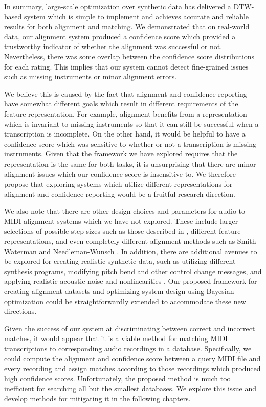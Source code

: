 In summary, large-scale optimization over synthetic data has delivered a DTW-based system which is simple to implement and achieves accurate and reliable results for both alignment and matching.
We demonstrated that on real-world data, our alignment system produced a confidence score which provided a trustworthy indicator of whether the alignment was successful or not.
Nevertheless, there was some overlap between the confidence score distributions for each rating.
This implies that our system cannot detect fine-grained issues such as missing instruments or minor alignment errors.

We believe this is caused by the fact that alignment and confidence reporting have somewhat different goals which result in different requirements of the feature representation.
For example, alignment benefits from a representation which is invariant to missing instruments so that it can still be successful when a transcription is incomplete.
On the other hand, it would be helpful to have a confidence score which was sensitive to whether or not a transcription is missing instruments.
Given that the framework we have explored requires that the representation is the same for both tasks, it is unsurprising that there are minor alignment issues which our confidence score is insensitive to.
We therefore propose that exploring systems which utilize different representations for alignment and confidence reporting would be a fruitful research direction.

We also note that there are other design choices and parameters for audio-to-MIDI alignment systems which we have not explored.
These include larger selections of possible step sizes such as those described in \cite{muller2007dynamic, sakoe1978dynamic}, different feature representations, and even completely different alignment methods such as Smith-Waterman \cite{ewert2012towards} and Needleman-Wunsch \cite{grachten2013automatic}.
In addition, there are additional avenues to be explored for creating realistic synthetic data, such as utilizing different synthesis programs, modifying pitch bend and other control change messages, and applying realistic acoustic noise and nonlinearities \cite{mcfee2015software}.
Our proposed framework for creating alignment datasets and optimizing system design using Bayesian optimization could be straightforwardly extended to accommodate these new directions.

Given the success of our system at discriminating between correct and incorrect matches, it would appear that it is a viable method for matching MIDI transcriptions to corresponding audio recordings in a database.
Specifically, we could compute the alignment and confidence score between a query MIDI file and every recording and assign matches according to those recordings which produced high confidence scores.
Unfortunately, the proposed method is much too inefficient for searching all but the smallest databases.
We explore this issue and develop methods for mitigating it in the following chapters.

